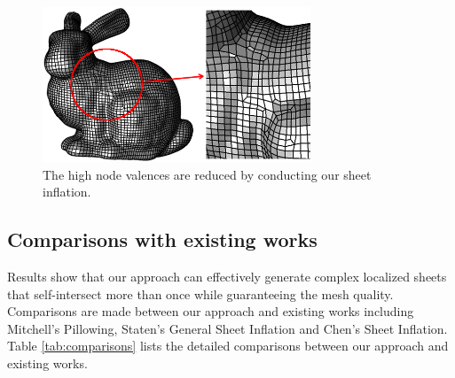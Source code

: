 \documentclass[final,5p,times,twocolumn]{elsarticle}
\begin{document}
\begin{figure}[htbp]
\begin{center}
\includegraphics[width=8cm]{bunny_result.png}
\caption{The high node valences are reduced by conducting our sheet inflation.}
\label{fig:bunny_result}
\end{center}
\end{figure}

\subsection{Comparisons with existing works}
\label{sec:comparisons}
Results show that our approach can effectively generate complex localized sheets that self-intersect more than once while guaranteeing the mesh quality. Comparisons are made between our approach and existing works including Mitchell's Pillowing\cite{Mitchell:1995wa}, Staten's General Sheet Inflation\cite{Staten:2009bo} and Chen's Sheet Inflation\cite{Chen:2015kf}. Table \ref{tab:comparisons} lists the detailed comparisons between our approach and existing works.
\end{document}
